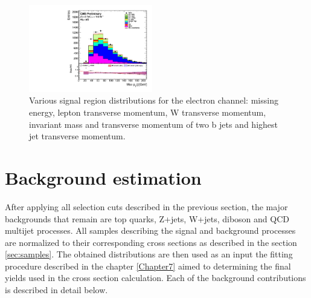 \begin{figure}[htbp]
		\includegraphics[width=0.48\textwidth]{Figures/Results/Electron/prefit/Wbb_max_hJet_pt_doQCD1.pdf}		
	\caption[Signal region distributions for the electron channel]{Various signal region distributions for the electron channel: missing energy, lepton transverse momentum, W transverse momentum, invariant mass and transverse momentum of two b jets and highest jet transverse momentum. }
	\label{fig:Wbb_prefit_electron}
\end{figure}


\section{Background estimation}
\label{sec:background}
After applying all selection cuts described in the previous section, the major backgrounds that remain are top quarks, Z+jets, W+jets, diboson and QCD multijet processes. All samples describing the signal and background processes are normalized to their corresponding cross sections as described in the section \ref{sec:samples}. The obtained distributions are then used as an input the fitting procedure described in the chapter \ref{Chapter7} aimed to determining the final yields used in the cross section calculation. Each of the background contributions is described in detail below. 

